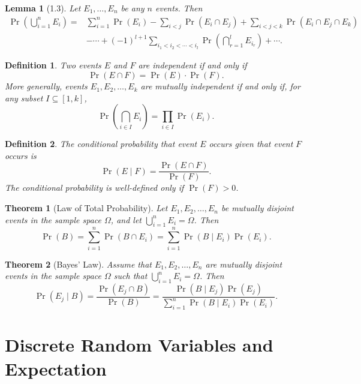 \documentclass{amsart}
\newtheorem*{definition}{Definition}
\newtheorem*{theorem}{Theorem}
\newtheorem*{lemma}{Lemma}
\begin{document}
\begin{lemma}[1.3]
  Let $E_1, \ldots, E_n$ be any $n$ events. Then
  \begin{align*}
    \Pr \left( \bigcup_{i = 1}^n E_i \right) = & \sum_{i = 1}^n \Pr(E_i) - \sum_{i
    < j} \Pr(E_i \cap E_j) + \sum_{i < j < k} \Pr(E_i \cap E_j \cap E_k) \\
    &- \cdots + {(-1)}^{l + 1} \sum_{i_1 < i_2 < \cdots < i_l} \Pr \left(
    \bigcap_{r = 1}^l E_{i_r} \right) + \cdots.
  \end{align*}
\end{lemma}

\begin{definition}
  Two events $E$ and $F$ are independent if and only if
  \[
    \Pr(E \cap F) = \Pr(E) \cdot \Pr(F).
  \]
  More generally, events $E_1, E_2, \ldots, E_k$ are mutually independent if and
  only if, for any subset $I \subseteq [1, k]$,
  \[
    \Pr \left( \bigcap_{i \in I} E_i \right) = \prod_{i \in I} \Pr(E_i).
  \]
\end{definition}

\begin{definition}
  The conditional probability that event $E$ occurs given that event $F$ occurs
  is
  \[
    \Pr(E \mid F) = \frac{\Pr(E \cap F)}{\Pr(F)}.
  \]
  The conditional probability is well-defined only if $\Pr(F) > 0$.
\end{definition}

\begin{theorem}[Law of Total Probability]
  Let $E_1, E_2, \ldots, E_n$ be mutually disjoint events in the sample space
  $\Omega$, and let $\bigcup_{i = 1}^n E_i = \Omega$. Then
  \[
    \Pr(B) = \sum_{i = 1}^n \Pr(B \cap E_i) = \sum_{i = 1}^n \Pr(B \mid E_i)
    \Pr(E_i).
  \]
\end{theorem}

\begin{theorem}[Bayes' Law]
  Assume that $E_1, E_2, \ldots, E_n$ are mutually disjoint events in the sample
  space $\Omega$ such that $\bigcup_{i = 1}^n E_i = \Omega$. Then
  \[
    \Pr(E_j \mid B) = \frac{\Pr(E_j \cap B)}{\Pr(B)} = \frac{\Pr(B \mid E_j)
    \Pr(E_j)}{\sum_{i = 1}^n \Pr(B \mid E_i) \Pr(E_i)}.
  \]
\end{theorem}

\section{Discrete Random Variables and Expectation}
\end{document}
